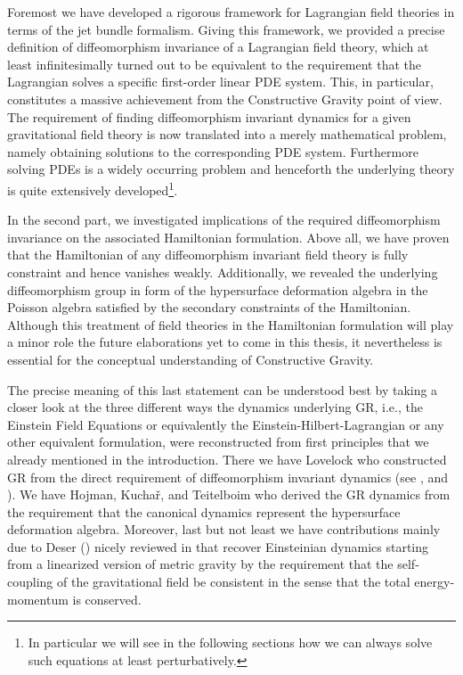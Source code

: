 \documentclass[a4paper,12pt, DIV=14, BCOR=5mm, twoside, headsepline, numbers=noenddot]{scrbook}
\begin{document}
Foremost we have developed a rigorous framework for Lagrangian field theories in terms of the jet bundle formalism.  Giving this framework, we provided a precise definition of diffeomorphism invariance of a Lagrangian field theory, which at least infinitesimally turned out to be equivalent to the requirement that the Lagrangian solves a specific first-order linear PDE system.  This, in particular, constitutes a massive achievement from the Constructive Gravity point of view. The requirement of finding diffeomorphism invariant dynamics for a given gravitational field theory is now translated into a merely mathematical problem, namely obtaining solutions to the corresponding PDE system. Furthermore solving PDEs is a widely occurring problem and henceforth the underlying theory is quite extensively developed\footnote{In particular we will see in the following sections how we can always solve such equations at least perturbatively.}.

In the second part, we investigated implications of the required diffeomorphism invariance on the associated Hamiltonian formulation. Above all, we have proven that the Hamiltonian of any diffeomorphism invariant field theory is fully constraint and hence vanishes weakly. Additionally, we revealed the underlying diffeomorphism group in form of the hypersurface deformation algebra in the Poisson algebra satisfied by the secondary constraints of the Hamiltonian. Although this treatment of field theories in the Hamiltonian formulation will play a minor role the future elaborations yet to come in this thesis, it nevertheless is essential for the conceptual understanding of Constructive Gravity. 

The precise meaning of this last statement can be understood best by taking a closer look at the three different ways the dynamics underlying GR, i.e., the Einstein Field Equations or equivalently the Einstein-Hilbert-Lagrangian or any other equivalent formulation, were reconstructed from first principles that we already mentioned in the introduction. There we have Lovelock who constructed GR from the direct requirement of diffeomorphism invariant dynamics (see \cite{Lovelock1969}, \cite{doi:10.1063/1.1665613} and \cite{doi:10.1063/1.1666069}). 
We have Hojman, Kuchař, and Teitelboim who derived the GR dynamics from the requirement that the canonical dynamics represent the hypersurface deformation algebra. Moreover, last but not least we have contributions mainly due to Deser (\cite{1970GReGr...1....9D}) nicely reviewed in \cite{2008IJMPD..17..367P} that recover Einsteinian dynamics starting from a linearized version of metric gravity by the requirement that the self-coupling of the gravitational field be consistent in the sense that the total energy-momentum is conserved.
\end{document}

